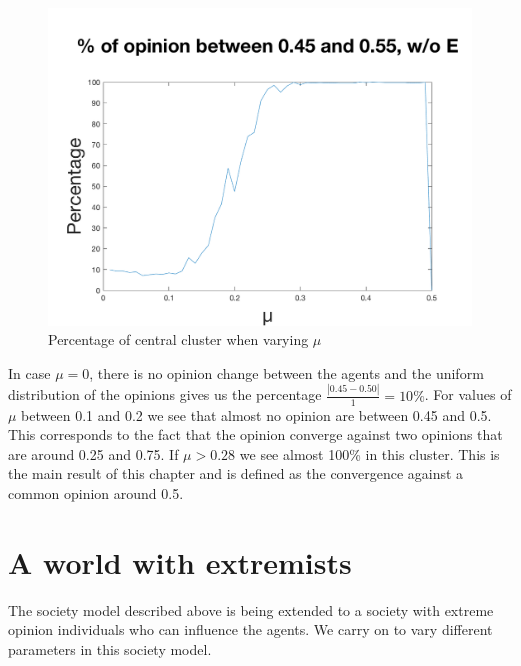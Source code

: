 \documentclass[11pt]{article}
\begin{document}
\begin{figure}[!htb]
\center
  \includegraphics[width=0.7\linewidth]{gen_plot_intervall_2017121813242572120e-01.png}
  \caption{Percentage of central cluster when varying $\mu$}
  \label{fig:uwithoutextremists}
\end{figure}

In case $\mu = 0$, there is no opinion change between the agents and the uniform distribution of the opinions gives us the percentage $\frac{|0.45-0.50|}{1} = 10\%$. For values of $\mu$ between 0.1 and 0.2 we see that almost no opinion are between 0.45 and 0.5. This corresponds to the fact that the opinion converge against two opinions that are around 0.25 and 0.75. If $\mu > 0.28$ we see almost 100\% in this cluster. This is the main result of this chapter and is defined as the convergence against a common opinion around 0.5.

\section{A world with extremists}
The society model described above is being extended to a society with extreme opinion individuals who can influence the agents. We carry on to vary different parameters in this society model.
\end{document}
